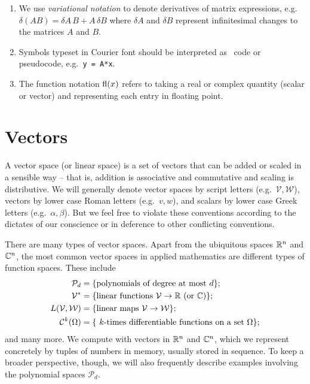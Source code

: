 \documentclass[12pt, leqno]{article} %
\begin{document}
\begin{enumerate}
\item
  We use {\em variational notation} to denote derivatives of matrix
  expressions, e.g.~$\delta (AB) = \delta A \, B + A \, \delta B$ where
  $\delta A$ and $\delta B$ represent infinitesimal changes to the
  matrices $A$ and $B$.

\item
  Symbols typeset in Courier font should be interpreted as \matlab\ code
  or pseudocode, e.g.~{\tt y = A*x}.

\item
  The function notation $\operatorname{fl}(x)$ refers to taking a real or complex
  quantity (scalar or vector) and representing each entry in floating
  point.

\end{enumerate}

\section{Vectors}

A vector space (or linear space) is a set of vectors that can be added
or scaled in a sensible way -- that is, addition is associative and
commutative and scaling is distributive.  We will generally denote
vector spaces by script letters (e.g.~$\mathcal{V}, \mathcal{W}$),
vectors by lower case Roman letters (e.g.~$v, w$), and scalars by
lower case Greek letters (e.g.~$\alpha, \beta$).  But we feel free to
violate these conventions according to the dictates of our conscience
or in deference to other conflicting conventions.

There are many types of vector spaces.  Apart from the ubiquitous
spaces $\mathbb{R}^n$ and $\mathbb{C}^n$, the most common vector spaces in applied
mathematics are different types of function spaces.  These include
\begin{align*}
  \mathcal{P}_d &=
  \{ \mbox{polynomials of degree at most $d$} \}; \\
  \mathcal{V}^* &=
  \{ \mbox{linear functions $\mathcal{V} \rightarrow \mathbb{R}$ (or $\mathbb{C}$)} \}; \\
  L(\mathcal{V}, \mathcal{W}) &=
  \{ \mbox{linear maps $\mathcal{V} \rightarrow \mathcal{W}$} \}; \\
  \mathcal{C}^k(\Omega) &=
  \{\mbox{ $k$-times differentiable functions on a set $\Omega$} \};
\end{align*}
and many more.  We compute with vectors in $\mathbb{R}^n$ and $\mathbb{C}^n$,
which we represent concretely by tuples of numbers in memory, usually
stored in sequence.  To keep a broader perspective, though, we will
also frequently describe examples involving the polynomial spaces
$\mathcal{P}_d$.
\end{document}
